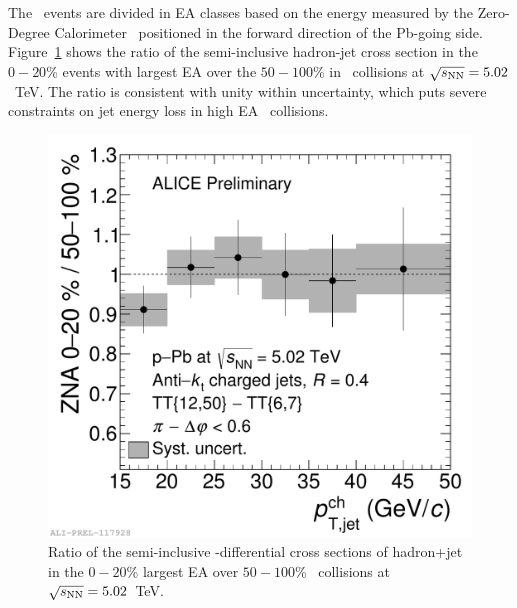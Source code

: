\documentclass[10pt]{article}
\begin{document}
The \pPb\ events are divided in EA classes based on the energy measured by the Zero-Degree Calorimeter~\cite{} positioned in the forward direction of the Pb-going side.
Figure~\ref{fig:rppbhjet} shows the ratio of the semi-inclusive hadron-jet cross section in the $0-20$\% events with largest EA over the $50-100$\%
in \pPb\ collisions at $\sqrt{s_{\rm NN}}=5.02$~TeV.
The ratio is consistent with unity within uncertainty, which puts severe constraints on jet energy loss in high EA \pPb\ collisions.
\begin{figure}[tb]
\centering
\includegraphics[width=.5\textwidth]{img/2017-Feb-01-ppb5_RCP_pap_AKT04_ZNA_split2}
\caption{Ratio of the semi-inclusive \pt-differential cross sections of hadron+jet in the $0-20$\% largest EA over $50-100$\% \pPb\ collisions at $\sqrt{s_{\rm NN}}=5.02$~TeV.}
\label{fig:rppbhjet}
\end{figure}
\end{document}
